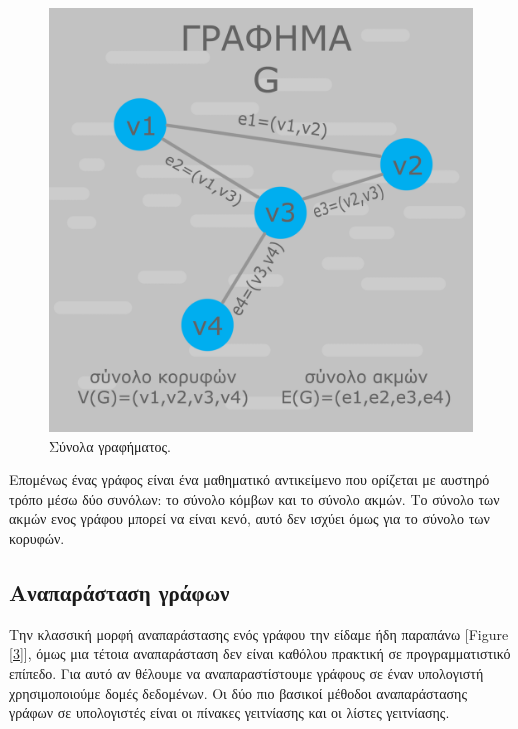 \begin{figure}
    \centering
    \includegraphics[scale=0.30]{2947_thesis/pictures/synola.png} 
    \caption{Σύνολα γραφήματος.}
    \label{7}
\end{figure}

Επομένως ένας γράφος είναι ένα μαθηματικό αντικείμενο που ορίζεται με αυστηρό τρόπο μέσω δύο συνόλων: το σύνολο κόμβων και το σύνολο ακμών. Το σύνολο των ακμών ενος γράφου μπορεί να είναι κενό, αυτό δεν ισχύει όμως για το σύνολο των κορυφών.

\subsection{Αναπαράσταση γράφων}
Την κλασσική μορφή αναπαράστασης ενός γράφου την είδαμε ήδη παραπάνω [Figure \ref{3}], όμως μια τέτοια αναπαράσταση δεν είναι καθόλου πρακτική σε προγραμματιστικό επίπεδο. Για αυτό αν θέλουμε να αναπαραστίστουμε γράφους σε έναν υπολογιστή χρησιμοποιούμε δομές δεδομένων. Οι δύο πιο βασικοί μέθοδοι αναπαράστασης γράφων σε υπολογιστές είναι οι πίνακες γειτνίασης και οι λίστες γειτνίασης. 


